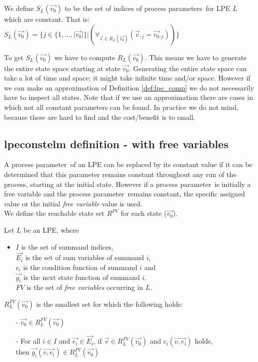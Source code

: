 \index{}\documentclass[a4paper,10pt]{article}
\theoremstyle{plain}
\theoremstyle{definition}
\newcommand{\ovr}{\overrightarrow}
\newcommand{\pp}{process parameter}
\newcommand{\pps}{process parameters}
\newcommand{\ti}{\textit}
\begin{document}
\begin{defn}\label{def:lpe_comp} We define $S_L(\ovr{v_0})$ to be the set of indices of \pps\ for LPE $L$ which are constant. That is:\\

$S_L(\ovr{v_0}) = \lbrace j \in  \lbrace 1, \ldots, \vert \ovr{v_0}\vert  \rbrace \vert (\forall_{\ovr{v} \in R_L(\ovr{v_0})}( \ovr{v}._j = \ovr{v_{0}}._j)) \rbrace $
\end{defn}

To get $S_L(\ovr{v_0})$ we have to compute $R_L(\ovr{v_0})$. This means we have to generate the entire state space starting at state $\ovr{v_0}$. Generating the entire state space can take a lot of time and space; it might take infinite time and/or space. However if we can make an approximation of Definition \ref{def:lpe_comp} we do not necessarily have to inspect all states. Note that if we use an approximation there are cases in which not all constant parameters can be found. In practice we do not mind, because these are hard to find and the cost/benefit is to small.

\subsection{lpeconstelm definition - with free variables}

A \pp\ of an LPE can be replaced by its constant value if it can be determined that this parameter remains constant throughout any run of the process, starting at the initial state. However if a \pp\ is initially a free variable and the \pp\ remains constant, the specific assigned value or the initial \ti{free variable} value is used.\\

We define the reachable state set $R^{FV}$ for each state ($\ovr{v_0}$). 
\begin{defn}\label{def:lpe} Let $L$ be an LPE, where\begin{itemize}
\item $I$ is the set of summand indices, \\ $\ovr{E_i}$ is the set of sum variables of summand $i$, \\ $c_i$ is the condition function of summand $i$ and \\ $\ovr{g_i}$ is the next state function of summand $i$. \\
$FV$ is the set of \ti{free variables} occurring in $L$.\\
\end{itemize}

$R_L^{FV}(\ovr{v_0})$ is the smallest set for which the following holds:
  \begin{itemize}
    \item[-] $\ovr{v_0} \in R_L^{FV}(\ovr{v_0})$
    \item[-] For all $i \in I$ and $\ovr{e_i} \in \ovr{E_i}$, if $\ovr{v} \in R_L^{FV}(\ovr{v_0})$ and $c_i(\ovr{v, e_i})$ holds, \\ then $\ovr{g_i}(\ovr{v, e_i}) \in R_L^{FV}(\ovr{v_0})$ \\
   \end{itemize}
\end{defn}
\end{document}
